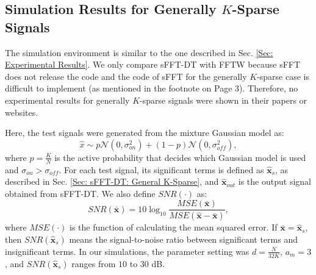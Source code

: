 \documentclass[journal,onecolumn,11pt]{IEEEtran}
\begin{document}
\subsection{Simulation Results for Generally $K$-Sparse Signals}\label{Sec: experimental result of General}
The simulation environment is similar to the one described in Sec. \ref{Sec: Experimental Results}.
We only compare sFFT-DT with FFTW because sFFT \cite{Haitham2012}\cite{Haitham2012_1} does not release the code and the code of sFFT for the generally $K$-sparse case is difficult to implement (as mentioned in the footnote on Page 3).
Therefore, no experimental results for generally $K$-sparse signals were shown in their papers or websites.

Here, the test signals were generated from the mixture Gaussian model as:
\small
\begin{equation}
   \hat{x} \sim p\mathcal{N}\left( 0,\sigma_{on}^{2} \right)+\left( 1-p \right) \mathcal{N} \left( 0,\sigma_{off}^{2} \right),
  \label{eq:signalproduce}
\end{equation}
\normalsize
where $  p=\frac{K}{N}$ is the active probability that decides which Gaussian model is used and $\sigma_{on}>\sigma_{off}$. For each test signal, its significant terms is defined as $\bm{\hat{x}}_{s}$, as described in Sec. \ref{Sec: sFFT-DT: General K-Sparse}, and $\bm{\hat{x}}_{out}$ is the output signal obtained from sFFT-DT.
We also define
$SNR(\cdot)$ as:
\small
\begin{equation}
SNR(\bm{\bar{x}})=10 \log_{10}   \frac{MSE(\bm{\bar{x}})}{MSE(\bm{\hat{x}}-\bm{\bar{x}})},
\label{Eq: SNR_ori}
\end{equation}
\normalsize
where $MSE( \cdot )$ is the function of calculating the mean squared error.
If $\bm{\bar{x}}=\bm{\hat{x}}_{s}$, then $SNR(\bm{\hat{x}}_{s})$ means the signal-to-noise ratio between significant terms and insignificant terms.
In our simulations, the parameter setting was $d=\frac{N}{32K}$, $a_{m}=3$, and $SNR(\bm{\hat{x}}_{s})$ ranges from $10$ to $30$ dB.
\end{document}
